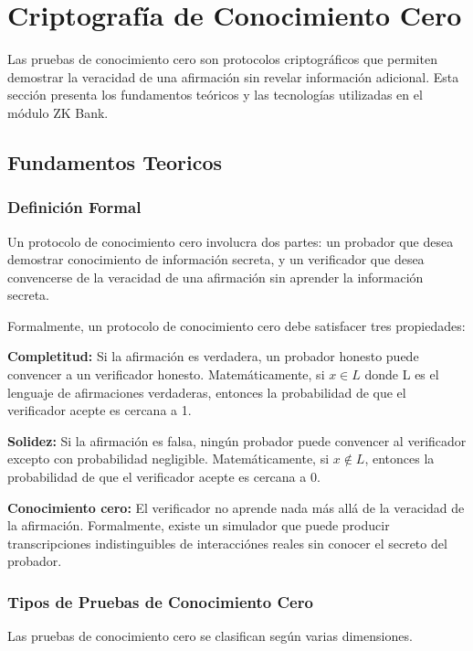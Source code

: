 \documentclass[12pt,a4paper,twoside]{book}
\begin{document}
\section{Criptografía de Conocimiento Cero}

Las pruebas de conocimiento cero son protocolos criptográficos que permiten demostrar la veracidad de una afirmación sin revelar información adicional. Esta sección presenta los fundamentos teóricos y las tecnologías utilizadas en el módulo ZK Bank.

\subsection{Fundamentos Teoricos}

\subsubsection{Definición Formal}

Un protocolo de conocimiento cero involucra dos partes: un probador que desea demostrar conocimiento de información secreta, y un verificador que desea convencerse de la veracidad de una afirmación sin aprender la información secreta.

Formalmente, un protocolo de conocimiento cero debe satisfacer tres propiedades:

\textbf{Completitud:} Si la afirmación es verdadera, un probador honesto puede convencer a un verificador honesto. Matemáticamente, si $x \in L$ donde L es el lenguaje de afirmaciones verdaderas, entonces la probabilidad de que el verificador acepte es cercana a 1.

\textbf{Solidez:} Si la afirmación es falsa, ningún probador puede convencer al verificador excepto con probabilidad negligible. Matemáticamente, si $x \notin L$, entonces la probabilidad de que el verificador acepte es cercana a 0.

\textbf{Conocimiento cero:} El verificador no aprende nada más allá de la veracidad de la afirmación. Formalmente, existe un simulador que puede producir transcripciones indistinguibles de interacciónes reales sin conocer el secreto del probador.

\subsubsection{Tipos de Pruebas de Conocimiento Cero}

Las pruebas de conocimiento cero se clasifican según varias dimensiones.
\end{document}
